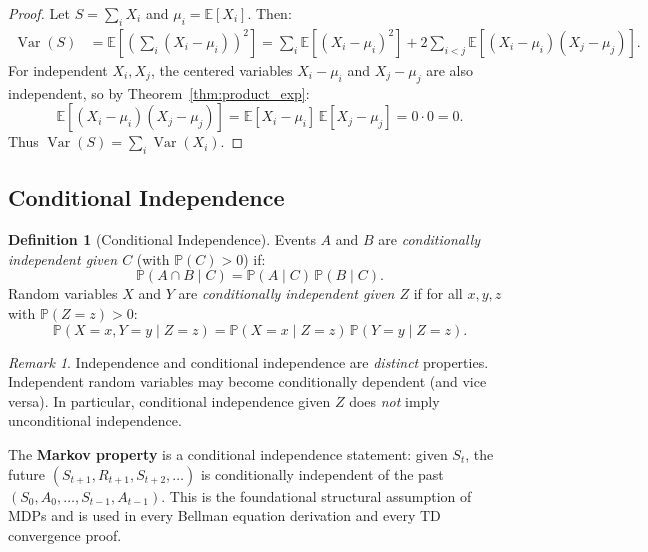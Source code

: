 \documentclass[11pt,a4paper]{article}
\theoremstyle{definition}
\newtheorem{definition}{Definition}[section]
\theoremstyle{plain}
\theoremstyle{remark}
\newtheorem{remark}{Remark}[section]
\DeclareMathOperator{\Var}{Var}
\newcommand{\E}{\mathbb{E}}
\newcommand{\Prob}{\mathbb{P}}
\begin{document}
\begin{proof}
Let $S = \sum_i X_i$ and $\mu_i = \E[X_i]$. Then:
\begin{align}
    \Var(S) &= \E\!\left[\left(\sum_i (X_i - \mu_i)\right)^2\right] = \sum_i \E[(X_i - \mu_i)^2] + 2 \sum_{i < j} \E[(X_i - \mu_i)(X_j - \mu_j)].
\end{align}
For independent $X_i, X_j$, the centered variables $X_i - \mu_i$ and $X_j - \mu_j$ are also independent, so by Theorem~\ref{thm:product_exp}:
\begin{equation}
    \E[(X_i - \mu_i)(X_j - \mu_j)] = \E[X_i - \mu_i]\, \E[X_j - \mu_j] = 0 \cdot 0 = 0.
\end{equation}
Thus $\Var(S) = \sum_i \Var(X_i)$.
\end{proof}

\subsection{Conditional Independence}
\label{subsec:cond_indep}

\begin{definition}[Conditional Independence]
\label{def:cond_indep}
Events $A$ and $B$ are \emph{conditionally independent given $C$} (with $\Prob(C) > 0$) if:
\begin{equation}
    \Prob(A \cap B \mid C) = \Prob(A \mid C)\, \Prob(B \mid C).
    \label{eq:cond_indep}
\end{equation}
Random variables $X$ and $Y$ are \emph{conditionally independent given $Z$} if for all $x, y, z$ with $\Prob(Z = z) > 0$:
\begin{equation}
    \Prob(X = x, Y = y \mid Z = z) = \Prob(X = x \mid Z = z)\, \Prob(Y = y \mid Z = z).
    \label{eq:cond_indep_rv}
\end{equation}
\end{definition}

\begin{remark}
Independence and conditional independence are \emph{distinct} properties. Independent random variables may become conditionally dependent (and vice versa). In particular, conditional independence given $Z$ does \emph{not} imply unconditional independence.
\end{remark}

\begin{rlconnection}[Connection to RL]
The \textbf{Markov property} is a conditional independence statement: given $S_t$, the future $(S_{t+1}, R_{t+1}, S_{t+2}, \ldots)$ is conditionally independent of the past $(S_0, A_0, \ldots, S_{t-1}, A_{t-1})$. This is the foundational structural assumption of MDPs and is used in every Bellman equation derivation and every TD convergence proof.
\end{rlconnection}
\end{document}
